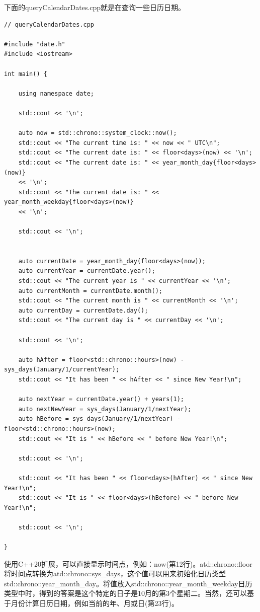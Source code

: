 下面的queryCalendarDates.cpp就是在查询一些日历日期。

\begin{lstlisting}[style=styleCXX]
// queryCalendarDates.cpp

#include "date.h"
#include <iostream>

int main() {
	
	using namespace date;
	
	std::cout << '\n';
	
	auto now = std::chrono::system_clock::now();
	std::cout << "The current time is: " << now << " UTC\n";
	std::cout << "The current date is: " << floor<days>(now) << '\n';
	std::cout << "The current date is: " << year_month_day{floor<days>(now)}
	<< '\n';
	std::cout << "The current date is: " << year_month_weekday{floor<days>(now)}
	<< '\n';
	
	std::cout << '\n';
	
	
	auto currentDate = year_month_day(floor<days>(now));
	auto currentYear = currentDate.year();
	std::cout << "The current year is " << currentYear << '\n';
	auto currentMonth = currentDate.month();
	std::cout << "The current month is " << currentMonth << '\n';
	auto currentDay = currentDate.day();
	std::cout << "The current day is " << currentDay << '\n';
	
	std::cout << '\n';
	
	auto hAfter = floor<std::chrono::hours>(now) - sys_days(January/1/currentYear);
	std::cout << "It has been " << hAfter << " since New Year!\n";
	
	auto nextYear = currentDate.year() + years(1);
	auto nextNewYear = sys_days(January/1/nextYear);
	auto hBefore = sys_days(January/1/nextYear) - floor<std::chrono::hours>(now);
	std::cout << "It is " << hBefore << " before New Year!\n";
	
	std::cout << '\n';
	
	std::cout << "It has been " << floor<days>(hAfter) << " since New Year!\n";
	std::cout << "It is " << floor<days>(hBefore) << " before New Year!\n";
	
	std::cout << '\n';
	
}
\end{lstlisting}

使用C++20扩展，可以直接显示时间点，例如：now(第12行)。atd::chrono::floor将时间点转换为atd::chrono::sys\_days，这个值可以用来初始化日历类型std::chrono::year\_month\_day。将值放入std::chrono::year\_month\_weekday日历类型中时，得到的答案是这个特定的日子是10月的第3个星期二。当然，还可以基于月份计算日历日期，例如当前的年、月或日(第23行)。

